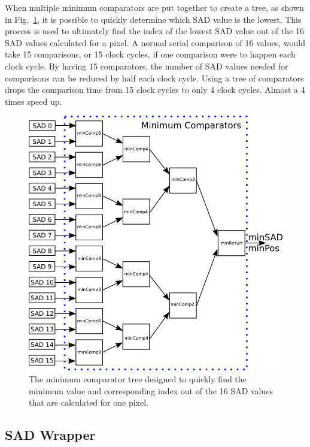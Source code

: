 When multiple minimum comparators are put together to create a tree, as shown in Fig.~\ref{fig:minComp}, it is possible to quickly determine which SAD value is the lowest. This process is used to ultimately find the index of the lowest SAD value out of the 16 SAD values calculated for a pixel. A normal serial comparison of 16 values, would take 15 comparisons, or 15 clock cycles, if one comparison were to happen each clock cycle. By having 15 comparators, the number of SAD values needed for comparisons can be reduced by half each clock cycle. Using a tree of comparators drops the comparison time from 15 clock cycles to only 4 clock cycles. Almost a 4 times speed up.

\begin{figure}[h]
	\begin{center}
		\includegraphics[width=150mm]{figures/minComparator.png}
		\captionfonts
		\caption{The minimum comparator tree designed to quickly find the minimum value and corresponding index out of the 16 SAD values that are calculated for one pixel.}
		\label{fig:minComp}
	\end{center}
\end{figure}

\subsection{SAD Wrapper}

